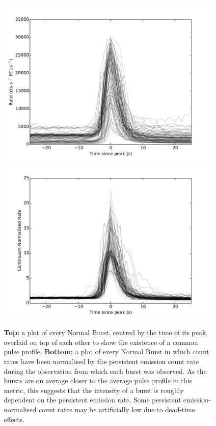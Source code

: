 \begin{figure}
  \centering
  \includegraphics[width=.9\linewidth, trim={0.4cm 0 1.1cm 0},clip]{images/1000norm.pdf}
  \includegraphics[width=.9\linewidth, trim={0.4cm 0 1.1cm 0},clip]{images/1000norm_renormed.pdf}
  \caption[A plot of every Normal Burst, centred by the time of its peak, overlaid on top of each other to show the existence of a common pulse profile.]{\small \textbf{Top:} a plot of every Normal Burst, centred by the time of its peak, overlaid on top of each other to show the existence of a common pulse profile.  \textbf{Bottom:} a plot of every Normal Burst in which count rates have been normalised by the persistent emission count rate during the observation from which each burst was observed.  As the bursts are on average closer to the average pulse profile in this metric, this suggests that the intensity of a burst is roughly dependent on the persistent emission rate.  Some persistent emission-normalised count rates may be artificially low due to dead-time effects.}
  \label{fig:norm_overlay}
\end{figure}

